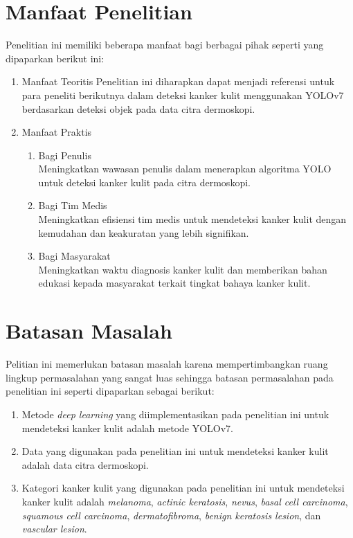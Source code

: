     \section{Manfaat Penelitian}
    Penelitian ini memiliki beberapa manfaat bagi berbagai pihak seperti yang dipaparkan berikut ini:
    \begin{enumerate}
        \item Manfaat Teoritis
        Penelitian ini diharapkan dapat menjadi referensi untuk para peneliti berikutnya dalam deteksi kanker kulit menggunakan YOLOv7 berdasarkan deteksi objek pada data citra dermoskopi.

        \item Manfaat Praktis
        \begin{enumerate}
            \item Bagi Penulis\\
            Meningkatkan wawasan penulis dalam menerapkan algoritma YOLO untuk deteksi kanker kulit pada citra dermoskopi.

            \item Bagi Tim Medis\\
            Meningkatkan efisiensi tim medis untuk mendeteksi kanker kulit dengan kemudahan dan keakuratan yang lebih signifikan.

            \item Bagi Masyarakat\\
            Meningkatkan waktu diagnosis kanker kulit dan memberikan bahan edukasi kepada masyarakat terkait tingkat bahaya kanker kulit.
        \end{enumerate}
    \end{enumerate}

    \section{Batasan Masalah}
    Pelitian ini memerlukan batasan masalah karena mempertimbangkan ruang lingkup permasalahan yang sangat luas sehingga batasan permasalahan pada penelitian ini seperti dipaparkan sebagai berikut:
    \begin{enumerate}
        \item Metode \textit{deep learning} yang diimplementasikan pada penelitian ini untuk mendeteksi kanker kulit adalah metode YOLOv7.
        \item Data yang digunakan pada penelitian ini untuk mendeteksi kanker kulit adalah data citra dermoskopi.
        \item Kategori kanker kulit yang digunakan pada penelitian ini untuk mendeteksi kanker kulit adalah \textit{melanoma}, \textit{actinic keratosis}, \textit{nevus}, \textit{basal cell carcinoma}, \textit{squamous cell carcinoma}, \textit{dermatofibroma}, \textit{benign keratosis lesion}, dan \textit{vascular lesion}.
    \end{enumerate}

